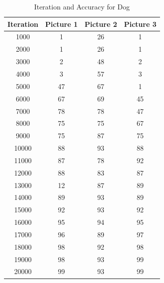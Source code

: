 \begin{table}[h!]
\centering
\begin{tabular}{|c|c|c|c|}
\hline
\textbf{Iteration} & \textbf{Picture 1} & \textbf{Picture 2} & \textbf{Picture 3} \\
\hline
1000 & 1 & 26 & 1 \\
2000 & 1 & 26 & 1 \\
3000 & 2 & 48 & 2 \\
4000 & 3 & 57 & 3 \\
5000 & 47 & 67 & 1 \\
6000 & 67 & 69 & 45 \\
7000 & 78 & 78 & 47 \\
8000 & 75 & 75 & 67 \\
9000 & 75 & 87 & 75 \\
10000 & 88 & 93 & 88 \\
11000 & 87 & 78 & 92 \\
12000 & 88 & 83 & 87 \\
13000 & 12 & 87 & 89 \\
14000 & 89 & 93 & 89 \\
15000 & 92 & 93 & 92 \\
16000 & 95 & 94 & 95 \\
17000 & 96 & 89 & 97 \\
18000 & 98 & 92 & 98 \\
19000 & 98 & 93 & 99 \\
20000 & 99 & 93 & 99 \\
\hline
\end{tabular}
\caption{Iteration and Accuracy for Dog}
\end{table}


